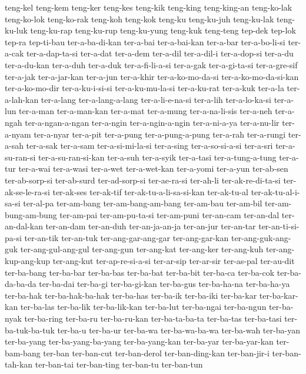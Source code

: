 {teng-kel teng-kem teng-ker teng-kes teng-kik teng-king teng-king-an
teng-ko-lak teng-ko-lok teng-ko-rak teng-koh teng-kok teng-ku teng-ku-juh
teng-ku-lak teng-ku-luk teng-ku-rap teng-ku-rup teng-ku-yung teng-kuk
teng-teng tep-dek tep-lok tep-ra tep-ti-bau ter-a-ba-di-kan ter-a-bai
ter-a-bai-kan ter-a-bar ter-a-bo-li-si ter-a-cak ter-a-dap-ta-si ter-a-dat
ter-a-dem ter-a-dil ter-a-dil-i ter-a-dop-si ter-a-du ter-a-du-kan
ter-a-duh ter-a-duk ter-a-fi-li-a-si ter-a-gak ter-a-gi-ta-si
ter-a-gre-sif ter-a-jak ter-a-jar-kan ter-a-jun ter-a-khir
ter-a-ko-mo-da-si ter-a-ko-mo-da-si-kan ter-a-ko-mo-dir ter-a-ku-i-si-si
ter-a-ku-mu-la-si ter-a-ku-rat ter-a-kuk ter-a-la ter-a-lah-kan ter-a-lang
ter-a-lang-a-lang ter-a-li-e-na-si ter-a-lih ter-a-lo-ka-si ter-a-lun
ter-a-man ter-a-man-kan ter-a-mat ter-a-mung ter-a-na-li-sis ter-a-neh
ter-a-ngah ter-a-ngan-a-ngan ter-a-ngin ter-a-ngin-a-ngin ter-a-ni-a-ya
ter-a-nu-lir ter-a-nyam ter-a-nyar ter-a-pit ter-a-pung ter-a-pung-a-pung
ter-a-rah ter-a-rungi ter-a-sah ter-a-sak ter-a-sam ter-a-si-mi-la-si
ter-a-sing ter-a-so-si-a-si ter-a-sri ter-a-su-ran-si ter-a-su-ran-si-kan
ter-a-suh ter-a-syik ter-a-tasi ter-a-tung-a-tung ter-a-tur ter-a-wai
ter-a-wasi ter-a-wet ter-a-wet-kan ter-a-yomi ter-a-yun ter-ab-sen
ter-ab-sorp-si ter-ab-surd ter-ad-sorp-si ter-ae-ra-si ter-ah-li
ter-ak-re-di-ta-si ter-ak-se-le-ra-si ter-ak-ses ter-ak-tif
ter-ak-tu-a-li-sa-si-kan ter-ak-tu-al ter-ak-tu-al-i-sa-si ter-al-pa
ter-am-bang ter-am-bang-am-bang ter-am-bau ter-am-bil ter-am-bung-am-bung
ter-am-pai ter-am-pu-ta-si ter-am-puni ter-an-cam ter-an-dal
ter-an-dal-kan ter-an-dam ter-an-duh ter-an-ja-an-ja ter-an-jur ter-an-tar
ter-an-ti-si-pa-si ter-an-tik ter-an-tuk ter-ang-gar-ang-gar
ter-ang-gar-kan ter-ang-guk-ang-guk ter-ang-gul-ang-gul ter-ang-gun
ter-ang-kat ter-ang-ker ter-ang-kuh ter-ang-kup-ang-kup ter-ang-kut
ter-ap-re-si-a-si ter-ar-sip ter-ar-sir ter-as-pal ter-au-dit ter-ba-bang
ter-ba-bar ter-ba-bas ter-ba-bat ter-ba-bit ter-ba-ca ter-ba-cok
ter-ba-da-ba-da ter-ba-dai ter-ba-gi ter-ba-gi-kan ter-ba-gus ter-ba-ha-na
ter-ba-ha-ya ter-ba-hak ter-ba-hak-ba-hak ter-ba-has ter-ba-ik ter-ba-iki
ter-ba-kar ter-ba-kar-kan ter-ba-las ter-ba-lik ter-ba-lik-kan ter-ba-lut
ter-ba-ngai ter-ba-ngun ter-ba-nyak ter-ba-ring ter-ba-ru ter-ba-ru-kan
ter-ba-ta-ba-ta ter-ba-tas ter-ba-tasi ter-ba-tuk-ba-tuk ter-ba-u
ter-ba-ur ter-ba-wa ter-ba-wa-ba-wa ter-ba-wah ter-ba-yan ter-ba-yang
ter-ba-yang-ba-yang ter-ba-yang-kan ter-ba-yar ter-ba-yar-kan ter-bam-bang
ter-ban ter-ban-cut ter-ban-derol ter-ban-ding-kan ter-ban-jir-i
ter-ban-tah-kan ter-ban-tai ter-ban-ting ter-ban-tu ter-ban-tun
}
